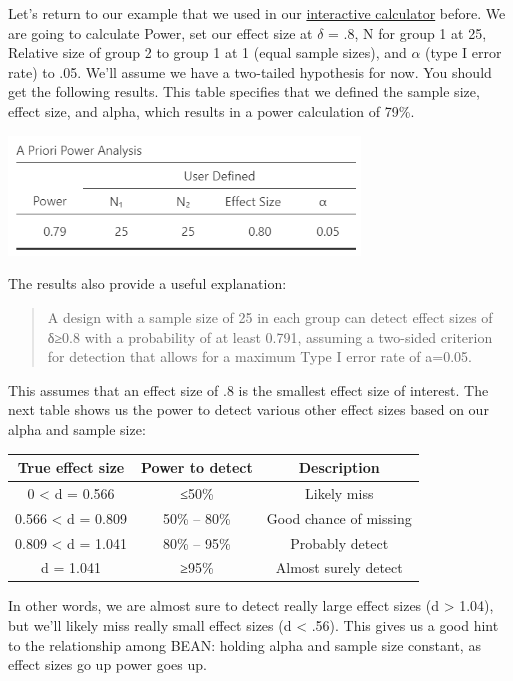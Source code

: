 \documentclass[
]{book}
\begin{document}
Let's return to our example that we used in our \href{https://rpsychologist.com/d3/pdist/}{interactive calculator} before. We are going to calculate Power, set our effect size at \(\delta\) = .8, N for group 1 at 25, Relative size of group 2 to group 1 at 1 (equal sample sizes), and \(\alpha\) (type I error rate) to .05. We'll assume we have a two-tailed hypothesis for now. You should get the following results. This table specifies that we defined the sample size, effect size, and alpha, which results in a power calculation of 79\%.

\includegraphics[width=3.67708in,height=\textheight]{images/05-bean/power-table.png}

The results also provide a useful explanation:

\begin{quote}
A design with a sample size of 25 in each group can detect effect sizes of δ≥0.8 with a probability of at least 0.791, assuming a two-sided criterion for detection that allows for a maximum Type I error rate of a=0.05.
\end{quote}

This assumes that an effect size of .8 is the smallest effect size of interest. The next table shows us the power to detect various other effect sizes based on our alpha and sample size:

\begin{longtable}[]{@{}ccc@{}}
\toprule
True effect size & Power to detect & Description \\
\midrule
\endhead
0 \textless{} d = 0.566 & ≤50\% & Likely miss \\
0.566 \textless{} d = 0.809 & 50\% -- 80\% & Good chance of missing \\
0.809 \textless{} d = 1.041 & 80\% -- 95\% & Probably detect \\
d = 1.041 & ≥95\% & Almost surely detect \\
\bottomrule
\end{longtable}

In other words, we are almost sure to detect really large effect sizes (d \textgreater{} 1.04), but we'll likely miss really small effect sizes (d \textless{} .56). This gives us a good hint to the relationship among BEAN: holding alpha and sample size constant, as effect sizes go up power goes up.
\end{document}
